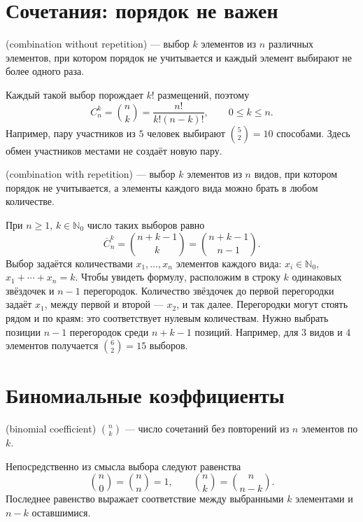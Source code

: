 \section{Сочетания: порядок не важен}

\begin{definition}
 (combination without repetition) ---
выбор \(k\) элементов из \(n\) различных элементов, при котором порядок не учитывается
и каждый элемент выбирают не более одного раза.
\end{definition}

Каждый такой выбор порождает \(k!\) размещений, поэтому
\[
C_n^k=\binom nk=\frac{n!}{k!(n-k)!},\qquad 0\le k\le n.
\]
Например, пару участников из \(5\) человек выбирают \(\binom52=10\) способами.
Здесь обмен участников местами не создаёт новую пару.

\begin{definition}
 (combination with repetition) ---
выбор \(k\) элементов из \(n\) видов, при котором порядок не учитывается,
а элементы каждого вида можно брать в любом количестве.
\end{definition}

При \(n\ge1\), \(k\in\mathbb N_0\) число таких выборов равно
\[
\overline C_n^k=\binom{n+k-1}{k}=\binom{n+k-1}{n-1}.
\]
Выбор задаётся количествами \(x_1,\ldots,x_n\) элементов каждого вида:
\(x_i\in\mathbb N_0\), \(x_1+\cdots+x_n=k\).
Чтобы увидеть формулу, расположим в строку \(k\) одинаковых звёздочек и \(n-1\) перегородок.
Количество звёздочек до первой перегородки задаёт \(x_1\), между первой и второй --- \(x_2\), и так далее.
Перегородки могут стоять рядом и по краям: это соответствует нулевым количествам.
Нужно выбрать позиции \(n-1\) перегородок среди \(n+k-1\) позиций.
Например, для \(3\) видов и \(4\) элементов получается \(\binom62=15\) выборов.

\section{Биномиальные коэффициенты}

\begin{definition}
 (binomial coefficient) \(\binom nk\)
--- число сочетаний без повторений из \(n\) элементов по \(k\).
\end{definition}

Непосредственно из смысла выбора следуют равенства
\[
\binom n0=\binom nn=1,\qquad
\binom nk=\binom n{n-k}.
\]
Последнее равенство выражает соответствие между выбранными \(k\) элементами
и \(n-k\) оставшимися.

